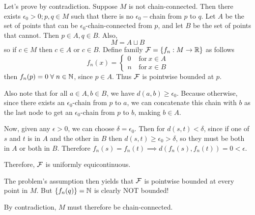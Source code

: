 \documentclass[a4paper, 12pt]{article}
\begin{document}
\begin{solution}
    Let's prove by contradiction. Suppose $M$ is not chain-connected. Then there exists $\epsilon_0 > 0; p, q \in M$ such that there is no $\epsilon_0-$chain from $p$ to $q$. Let $A$ be the set of points that can be $\epsilon_0$-chain-connected from $p$, and let $B$ be the set of points that cannot. Then $p \in A, q \in B$. Also, \[
    M = A \sqcup B
    \]
    so if $c \in M$ then $c \in A$ or $c \in B$. Define family $\mathcal{F} = \{f_n: M \to \mathbb{R}\}$ as follows \[
    f_n(x) = \begin{cases}
        0 &\:\text{for}\: x \in A \\
        n &\:\text{for}\: x \in B
    \end{cases}
    \]
    then $f_n(p) = 0 \forall n \in \bbn$, since $p \in A$. Thus $\mathcal{F}$ is pointwise bounded at $p$.

    Also note that for all $a \in A, b \in B$, we have $d(a, b) \geq \epsilon_0$. Because otherwise, since there exists an $\epsilon_0$-chain from $p$ to $a$, we can concatenate this chain with $b$ as the last node to get an $\epsilon_0$-chain from $p$ to $b$, making $b \in A$.
    
    Now, given any $\epsilon > 0$, we can choose $\delta = \epsilon_0$. Then for $d(s, t) < \delta$, since if one of $s$ and $t$ is in $A$ and the other in $B$ then $d(s, t) \geq \epsilon_0 > \delta$, so they must be both in $A$ or both in $B$. Therefore $f_n(s) = f_n(t) \implies d(f_n(s), f_n(t)) = 0 < \epsilon$.

    Therefore, $\mathcal{F}$ is uniformly equicontinuous.

    The problem's assumption then yields that $\mathcal{F}$ is pointwise bounded at every point in $M$. But $\{f_n(q)\} = \mathbb{N}$ is clearly NOT bounded! \contra

    By contradiction, $M$ must therefore be chain-connected.
\end{solution}
\end{document}
